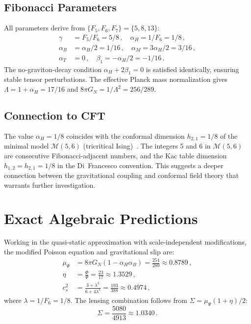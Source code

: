 \documentclass[twocolumn,showpacs,preprintnumbers,amsmath,amssymb,prd]{revtex4-2}
\begin{document}
\subsection{Fibonacci Parameters}

All parameters derive from $\{F_5, F_6, F_7\} = \{5, 8, 13\}$:
\begin{align}
\gamma &= F_5/F_6 = 5/8\,,\quad \alpha_H = 1/F_6 = 1/8\,,\\
\alpha_B &= \alpha_H/2 = 1/16\,,\quad \alpha_M = 3\alpha_H/2 = 3/16\,,\\
\alpha_T &= 0\,,\quad \beta_1 = -\alpha_H/2 = -1/16\,.
\end{align}
The no-graviton-decay condition $\alpha_H + 2\beta_1 = 0$ is satisfied identically, ensuring stable tensor perturbations. The effective Planck mass normalization gives $\Lambda = 1 + \alpha_H = 17/16$ and $8\pi G_N = 1/\Lambda^2 = 256/289$.

\subsection{Connection to CFT}

The value $\alpha_H = 1/8$ coincides with the conformal dimension $h_{2,1} = 1/8$ of the minimal model $\mathcal{M}(5,6)$ (tricritical Ising)~\cite{DiFrancesco1997}. The integers 5 and 6 in $\mathcal{M}(5,6)$ are consecutive Fibonacci-adjacent numbers, and the Kac table dimension $h_{1,2} = h_{2,1} = 1/8$ in the Di~Francesco convention. This suggests a deeper connection between the gravitational coupling and conformal field theory that warrants further investigation.

\section{Exact Algebraic Predictions}
\label{sec:predictions}

Working in the quasi-static approximation with scale-independent modifications, the modified Poisson equation and gravitational slip are:
\begin{align}
\mu_\Psi &= 8\pi G_N(1 - \alpha_H\alpha_B) = \frac{254}{289} \approx 0.8789\,,\label{eq:muPsi}\\
\eta &= \frac{\Phi}{\Psi} = \frac{23}{17} \approx 1.3529\,,\label{eq:eta}\\
c_s^2 &= \frac{3+\lambda^2}{6+4\lambda^2} = \frac{193}{388} \approx 0.4974\,,\label{eq:cs2}
\end{align}
where $\lambda = 1/F_6 = 1/8$. The lensing combination follows from $\Sigma = \mu_\Psi(1+\eta)/2$:
\begin{equation}
\Sigma = \frac{5080}{4913} \approx 1.0340\,.
\end{equation}
\end{document}
